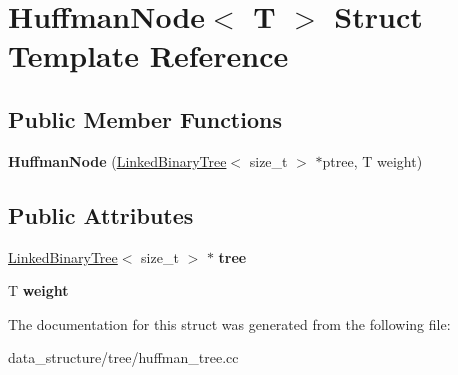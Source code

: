 \hypertarget{structHuffmanNode}{}\section{Huffman\+Node$<$ T $>$ Struct Template Reference}
\label{structHuffmanNode}
\subsection*{Public Member Functions}
\begin{DoxyCompactItemize}
\item 
\mbox{\label{structHuffmanNode_a5aba43634df75a97b2114baba4dfb123}} 
{\bfseries Huffman\+Node} (\hyperlink{classLinkedBinaryTree}{Linked\+Binary\+Tree}$<$ size\+\_\+t $>$ $\ast$ptree, T weight)
\end{DoxyCompactItemize}
\subsection*{Public Attributes}
\begin{DoxyCompactItemize}
\item 
\mbox{\label{structHuffmanNode_ad4779f77355c50735e51fde718f7dc1e}} 
\hyperlink{classLinkedBinaryTree}{Linked\+Binary\+Tree}$<$ size\+\_\+t $>$ $\ast$ {\bfseries tree}
\item 
\mbox{\label{structHuffmanNode_a213b1555f15afc248eb7ec5843f6280a}} 
T {\bfseries weight}
\end{DoxyCompactItemize}


The documentation for this struct was generated from the following file\+:\begin{DoxyCompactItemize}
\item 
data\+\_\+structure/tree/huffman\+\_\+tree.\+cc\end{DoxyCompactItemize}
